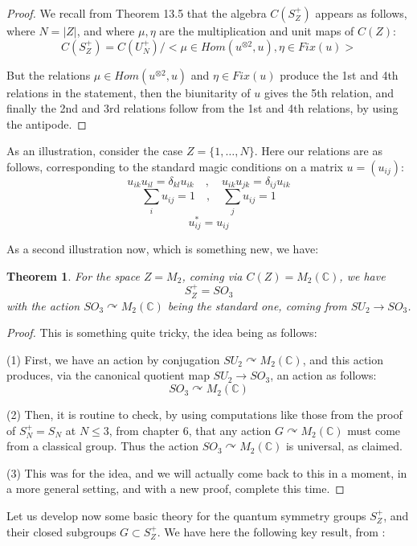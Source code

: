 \documentclass[12pt]{amsbook}
\newtheorem{theorem}{Theorem}[chapter]
\begin{document}
\begin{proof}
We recall from Theorem 13.5 that the algebra $C(S_Z^+)$ appears as follows, where $N=|Z|$, and where $\mu,\eta$ are the multiplication and unit maps of $C(Z)$:
$$C(S_Z^+)=C(U_N^+)\Big/\Big<\mu\in Hom(u^{\otimes2},u),\eta\in Fix(u)\Big>$$

But the relations $\mu\in Hom(u^{\otimes2},u)$ and $\eta\in Fix(u)$ produce the 1st and 4th relations in the statement, then the biunitarity of $u$ gives the 5th relation, and finally the 2nd and 3rd relations follow from the 1st and 4th relations, by using the antipode.
\end{proof}

As an illustration, consider the case $Z=\{1,\ldots,N\}$. Here our relations are as follows, corresponding to the standard magic conditions on a matrix $u=(u_{ij})$:
$$u_{ik}u_{il}=\delta_{kl}u_{ik}\quad,\quad u_{ik}u_{jk}=\delta_{ij}u_{ik}$$
$$\sum_iu_{ij}=1\quad,\quad\sum_ju_{ij}=1$$
$$u_{ij}^*=u_{ij}$$

As a second illustration now, which is something new, we have:

\begin{theorem}
For the space $Z=M_2$, coming via $C(Z)=M_2(\mathbb C)$, we have 
$$S_Z^+=SO_3$$
with the action $SO_3\curvearrowright M_2(\mathbb C)$ being the standard one, coming from $SU_2\to SO_3$.
\end{theorem}

\begin{proof}
This is something quite tricky, the idea being as follows:

\medskip

(1) First, we have an action by conjugation $SU_2\curvearrowright M_2(\mathbb C)$, and this action produces, via the canonical quotient map $SU_2\to SO_3$, an action as follows:
$$SO_3\curvearrowright M_2(\mathbb C)$$

(2) Then, it is routine to check, by using computations like those from the proof of $S_N^+=S_N$ at $N\leq3$, from chapter 6, that any action $G\curvearrowright M_2(\mathbb C)$ must come from a classical group. Thus the action $SO_3\curvearrowright M_2(\mathbb C)$ is universal, as claimed.

\medskip

(3) This was for the idea, and we will actually come back to this in a moment, in a more general setting, and with a new proof, complete this time. 
\end{proof}

Let us develop now some basic theory for the quantum symmetry groups $S_Z^+$, and their closed subgroups $G\subset S_Z^+$. We have here the following key result, from \cite{ba1}:
\end{document}

